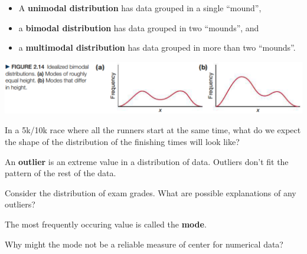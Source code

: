 \documentclass[../mathNotesPreamble]{subfiles}
\begin{document}
  \begin{defn*}
    \begin{itemize}
      \item A \textbf{unimodal distribution} has data grouped in a single ``mound'',
      \item a \textbf{bimodal distribution} has data grouped in two ``mounds'', and
      \item a \textbf{multimodal distribution} has data grouped in more than two ``mounds''.
    \end{itemize}
  \end{defn*}
  \begin{center}
    \includegraphics[width=0.95\linewidth]{images/math211_figure_2p14}
  \end{center}
  \begin{ex*}
    In a 5k/10k race where all the runners start at the same time, what do we expect the shape of the distribution of the finishing times will look like?
  \end{ex*}
  \pagebreak
  
  \begin{defn*}
    An \textbf{outlier} is an extreme value in a distribution of data. Outliers don't fit the pattern of the rest of the data.
  \end{defn*}
  \begin{ex*}
    Consider the distribution of exam grades. What are possible explanations of any outliers?
  \end{ex*}
  
  \begin{defn*}
    The most frequently occuring value is called the \textbf{mode}.
  \end{defn*}

  \noindent
  Why might the mode not be a reliable measure of center for numerical data?
  \vspace*{5\baselineskip}
  \pagebreak
  

  \pagebreak
\end{document}

